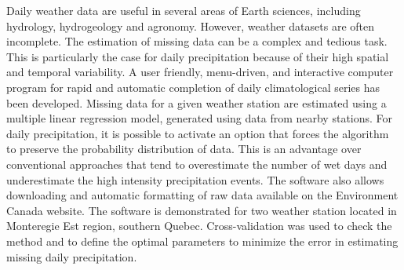 \documentclass[ARTICLETHERMIC.tex]{subfiles}
\begin{document}
\noindent 
Daily weather data are useful in several areas of Earth sciences, including hydrology, hydrogeology and agronomy. However, weather datasets are often incomplete. The estimation of missing data can be a complex and tedious task. This is particularly the case for daily precipitation because of their high spatial and temporal variability. A user friendly, menu-driven, and interactive computer program for rapid and automatic completion of daily climatological series has been developed. Missing data for a given weather station are estimated using a multiple linear regression model, generated using data from nearby stations. For daily precipitation, it is possible to activate an option that forces the algorithm to preserve the probability distribution of data. This is an advantage over conventional approaches that tend to overestimate the number of wet days and underestimate the high intensity precipitation events. The software also allows downloading and automatic formatting of raw data available on the Environment Canada website. The software is demonstrated for two weather station located in Monteregie Est region, southern Quebec. Cross-validation was used to check the method and to define the optimal parameters to minimize the error in estimating missing daily precipitation.
\end{document}
